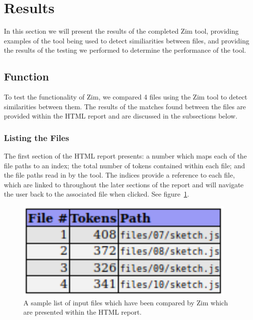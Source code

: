 \documentclass[11pt, a4paper]{article}
\begin{document}
\section{Results}

In this section we will present the results of the completed Zim tool, providing examples of the tool being used to detect similiarities between files, and providing the results of the testing we performed to determine the performance of the tool.

\subsection{Function}

To test the functionality of Zim, we compared 4 files using the Zim tool to detect similarities between them. The results of the matches found between the files are provided within the HTML report and are discussed in the subsections below. 

\subsubsection{Listing the Files}

The first section of the HTML report presents: a number which maps each of the file paths to an index; the total number of tokens contained within each file; and the file paths read in by the tool. The indices provide a reference to each file, which are linked to throughout the later sections of the report and will navigate the user back to the associated file when clicked. See figure~\ref{fig:reportFiles}.

\begin{figure}
\begin{center}
\includegraphics[scale=0.86]{ReportFiles}
\end{center}
\caption{\label{fig:reportFiles}A sample list of input files which have been compared by Zim which are presented within the HTML report.}
\end{figure}
\end{document}
